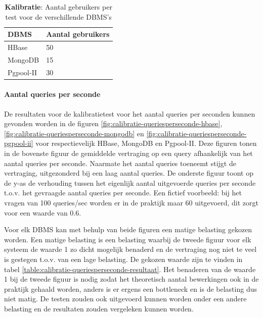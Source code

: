 \begin{table}[ht!]
	\centering
	\begin{tabular}{l| l }
		\textbf{DBMS} & Aantal gebruikers \\
		\hline
		HBase & 50 \\
		MongoDB & 15\\
		Pgpool-II & 30\\
	\end{tabular}
	\caption{\textbf{Kalibratie}: Aantal gebruikers per test voor de verschillende DBMS's}
	\label{table:calibratie-gebruikers-resultaat}
\end{table}

\paragraph{Aantal queries per seconde}
De resultaten voor de kalibratietest voor het aantal queries per seconden kunnen gevonden worden in de figuren \ref{fig:calibratie-queriesperseconde-hbase}, \ref{fig:calibratie-queriesperseconde-mongodb} en \ref{fig:calibratie-queriesperseconde-pgpool-ii} voor respectievelijk HBase, MongoDB en Pgpool-II. Deze figuren tonen in de bovenste figuur de gemiddelde vertraging op een query afhankelijk van het aantal queries per seconde. Naarmate het aantal queries toeneemt stijgt de vertraging, uitgezonderd bij een laag aantal queries. De onderste figuur toont op de y-as de verhouding tussen het eigenlijk aantal uitgevoerde queries per seconde t.o.v. het gevraagde aantal queries per seconde. Een fictief voorbeeld: bij het vragen van 100 queries/sec worden er in de praktijk maar 60 uitgevoerd, dit zorgt voor een waarde van $0.6$. 

Voor elk DBMS kan met behulp van beide figuren een matige belasting gekozen worden. Een matige belasting is een belasting waarbij de tweede figuur voor elk systeem de waarde 1 zo dicht mogelijk benaderd en de vertraging nog niet te veel is gestegen t.o.v. van een lage belasting. De gekozen waarde zijn te vinden in tabel \ref{table:calibratie-queriesperseconde-resultaat}. Het benaderen van de waarde 1 bij de tweede figuur is nodig zodat het theoretisch aantal bewerkingen ook in de praktijk gehaald worden, anders is er ergens een bottleneck en is de belasting dus niet matig. De testen zouden ook uitgevoerd kunnen worden onder een andere belasting en de resultaten zouden vergeleken kunnen worden. 

